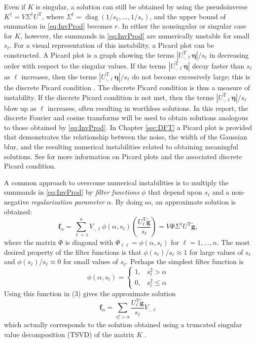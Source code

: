 \documentclass[12pt,notitlepage]{report}
\newcommand{\gnoiseVec}{\widetilde{\mathbf{g}}}	%
\newcommand{\kMat}{K}	%
\newcommand{\fVec}{\mathbf{f}}	%
\newcommand{\trans}{\mathrm{T}}	%
\DeclareMathOperator{\diag}{diag}	%
\newcommand{\regparam}{\alpha}
\newcommand{\filt}{\phi}
\newcommand{\noise}{\eta}	%
\newcommand{\noiseVec}{\bm{\noise}}	%
\newcommand{\singular}{s}	%
\begin{document}
Even if $\kMat$ is singular, a solution can still be obtained by using the pseudoinverse $\kMat^\dagger = V{\Sigma^\dagger}U^\trans$, where $\Sigma^\dagger = \diag(1/\singular_1,\ldots,1/\singular_r)$, and the upper bound of summation in \eqref{eq:InvProd} becomes $r$. In either the nonsingular or singular case for $\kMat$, however, the summands in \eqref{eq:InvProd} are numerically unstable for small $\singular_\ell$. For a visual representation of this instability, a Picard plot can be constructed. A Picard plot is a graph showing the terms $|U^\trans_{\cdot,\ell}\noiseVec|/\singular_\ell$ in decreasing order with respect to the singular values. If the terms $|U^\trans_{\cdot,\ell}\noiseVec|$ decay faster than $\singular_\ell$ as $\ell$ increases, then the terms $|U^\trans_{\cdot,\ell}\noiseVec|/\singular_\ell$ do not become excessively large; this is the discrete Picard condition \cite{ABT}. The discrete Picard condition is thus a measure of instability. If the discrete Picard condition is not met, then the terms $|U^\trans_{\cdot,\ell}\noiseVec|/\singular_\ell$ blow up as $\ell$ increases, often resulting in worthless solutions. In this report, the discrete Fourier and cosine transforms will be used to obtain solutions analogous to those obtained by \eqref{eq:InvProd}. In Chapter \ref{sec:DFT} a Picard plot is provided that demonstrates the relationship between the noise, the width of the Gaussian blur, and the resulting numerical instabilities related to obtaining meaningful solutions. See \cite{Hansen1990} for more information on Picard plots and the associated discrete Picard condition. \par 
A common approach to overcome numerical instabilities is to multiply the summands in \eqref{eq:InvProd} by \textit{filter functions} $\filt$ that depend upon $\singular_\ell$ and a non-negative \textit{regularization parameter} $\regparam$. By doing so, an approximate solution is obtained:
\begin{equation}
\fVec_\regparam = \sum_{\ell = 1}^n V_{\cdot,\ell}\filt(\regparam,\singular_\ell)\left(\frac{{U^\trans_\ell}\gnoiseVec}{\singular_\ell}\right) = V\Phi\Sigma^\dagger U^\trans\gnoiseVec,
\label{eq:ApproxSol}
\end{equation}
where the matrix $\Phi$ is diagonal with $\Phi_{\ell\ell} = \filt(\regparam,\singular_\ell)$ for $\ell = 1,\ldots,n$. The most desired property of the filter functions is that $\filt(\singular_\ell)/\singular_\ell \approx 1$  for large values of $\singular_\ell$ and $\filt(\singular_\ell)/\singular_\ell \approx 0$ for small values of $\singular_\ell$.  Perhaps the simplest filter function is
\[\filt(\regparam,\singular_\ell) = \begin{cases}
1, & \singular_\ell^2 > \regparam \\
0, & \singular_\ell^2 \leq \regparam
\end{cases}\]
Using this function in (3) gives the approximate solution
\[\fVec_\regparam = \sum_{\singular_\ell^2 > \regparam} \frac{{U^\trans_\ell}\gnoiseVec}{\singular_\ell}V_{\cdot,\ell}\]
which actually corresponds to the solution obtained using a truncated singular value decomposition (TSVD) of the matrix $\kMat$ \cite{Vogel:2002}. \par
\end{document}

